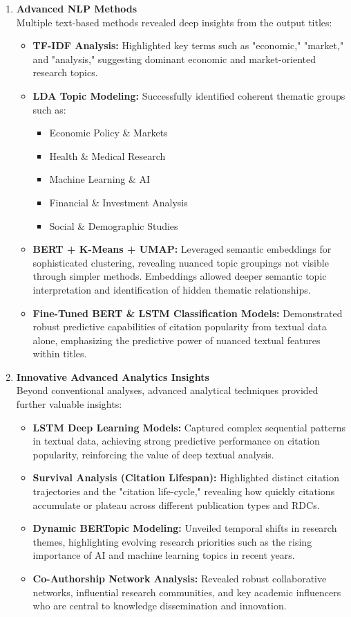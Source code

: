 \documentclass[12pt]{article}
\begin{document}
\begin{enumerate}
  \item \textbf{Advanced NLP Methods}\\
    Multiple text-based methods revealed deep insights from the output titles:
    \begin{itemize}
      \item \textbf{TF-IDF Analysis:} Highlighted key terms such as "economic," "market," and "analysis," suggesting dominant economic and market-oriented research topics.
      \item \textbf{LDA Topic Modeling:} Successfully identified coherent thematic groups such as:
        \begin{itemize}
          \item Economic Policy \& Markets
          \item Health \& Medical Research
          \item Machine Learning \& AI
          \item Financial \& Investment Analysis
          \item Social \& Demographic Studies
        \end{itemize}
      \item \textbf{BERT + K-Means + UMAP:} Leveraged semantic embeddings for sophisticated clustering, revealing nuanced topic groupings not visible through simpler methods. Embeddings allowed deeper semantic topic interpretation and identification of hidden thematic relationships.
      \item \textbf{Fine-Tuned BERT \& LSTM Classification Models:} Demonstrated robust predictive capabilities of citation popularity from textual data alone, emphasizing the predictive power of nuanced textual features within titles.
    \end{itemize}

  \item \textbf{Innovative Advanced Analytics Insights}\\
    Beyond conventional analyses, advanced analytical techniques provided further valuable insights:
    \begin{itemize}
      \item \textbf{LSTM Deep Learning Models:} Captured complex sequential patterns in textual data, achieving strong predictive performance on citation popularity, reinforcing the value of deep textual analysis.
      \item \textbf{Survival Analysis (Citation Lifespan):} Highlighted distinct citation trajectories and the "citation life-cycle," revealing how quickly citations accumulate or plateau across different publication types and RDCs.
      \item \textbf{Dynamic BERTopic Modeling:} Unveiled temporal shifts in research themes, highlighting evolving research priorities such as the rising importance of AI and machine learning topics in recent years.
      \item \textbf{Co-Authorship Network Analysis:} Revealed robust collaborative networks, influential research communities, and key academic influencers who are central to knowledge dissemination and innovation.
    \end{itemize}
\end{enumerate}
\end{document}
